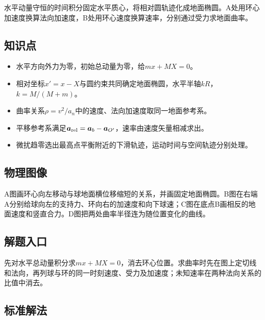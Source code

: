 \documentclass[UTF8,fontset=fandol,a4paper,11pt]{ctexart}
\begin{document}
水平动量守恒的时间积分固定水平质心，将相对圆轨迹化成地面椭圆。A处用环心加速度换算法向加速度，B处用环心速度换算速率，分别通过受力求地面曲率。



\subsection*{知识点}

\begin{itemize}
\item 水平方向外力为零，初始总动量为零，给$mx+MX=0$。
\item 相对坐标$x'=x-X$与圆约束共同确定地面椭圆，水平半轴$kR$，$k=M/(M+m)$。
\item 曲率关系$\rho=v^2/a_n$中的速度、法向加速度取同一地面参考系。
\item 平移参考系满足$\boldsymbol a_{\rm rel}=\boldsymbol a_b-\boldsymbol a_{O'}$，速率由速度矢量相减求出。
\item 微扰趋零选出最高点平衡附近的下滑轨迹，运动时间与空间轨迹分别处理。\end{itemize}



\subsection*{物理图像}

A图画环心向左移动与球地面横位移缩短的关系，并画固定地面椭圆。B图在右端A分别给球向左的支持力、环向右的加速度和向下球速；C图在底点B画相反的地面速度和竖直合力。D图把两处曲率半径连为随位置变化的曲线。



\subsection*{解题入口}

先对水平总动量积分求$mx+MX=0$，消去环心位置。求曲率时先在图上定切线和法向，再列球与环的同一时刻速度、受力及加速度；未知速率在两种法向关系的比值中消去。



\subsection*{标准解法}
\end{document}
